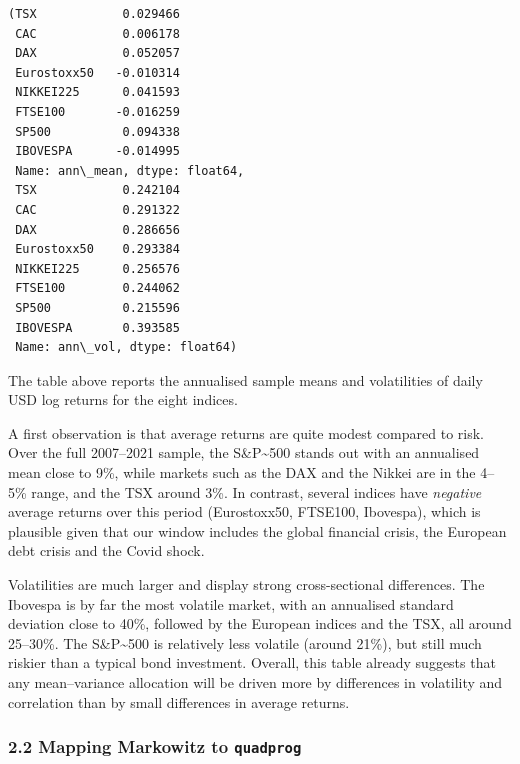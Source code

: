 \documentclass[11pt]{article}
\begin{document}
            \begin{tcolorbox}[breakable, size=fbox, boxrule=.5pt, pad at break*=1mm, opacityfill=0]
\begin{Verbatim}[commandchars=\\\{\}]
(TSX            0.029466
 CAC            0.006178
 DAX            0.052057
 Eurostoxx50   -0.010314
 NIKKEI225      0.041593
 FTSE100       -0.016259
 SP500          0.094338
 IBOVESPA      -0.014995
 Name: ann\_mean, dtype: float64,
 TSX            0.242104
 CAC            0.291322
 DAX            0.286656
 Eurostoxx50    0.293384
 NIKKEI225      0.256576
 FTSE100        0.244062
 SP500          0.215596
 IBOVESPA       0.393585
 Name: ann\_vol, dtype: float64)
\end{Verbatim}
\end{tcolorbox}
        
    The table above reports the annualised sample means and volatilities of
daily USD log returns for the eight indices.

A first observation is that average returns are quite modest compared to
risk. Over the full 2007--2021 sample, the S\&P\textasciitilde500 stands
out with an annualised mean close to 9\%, while markets such as the DAX
and the Nikkei are in the 4--5\% range, and the TSX around 3\%. In
contrast, several indices have \emph{negative} average returns over this
period (Eurostoxx50, FTSE100, Ibovespa), which is plausible given that
our window includes the global financial crisis, the European debt
crisis and the Covid shock.

Volatilities are much larger and display strong cross-sectional
differences. The Ibovespa is by far the most volatile market, with an
annualised standard deviation close to 40\%, followed by the European
indices and the TSX, all around 25--30\%. The S\&P\textasciitilde500 is
relatively less volatile (around 21\%), but still much riskier than a
typical bond investment. Overall, this table already suggests that any
mean--variance allocation will be driven more by differences in
volatility and correlation than by small differences in average returns.

    \hypertarget{mapping-markowitz-to-quadprog}{%
\subsubsection{\texorpdfstring{2.2 Mapping Markowitz to
\texttt{quadprog}}{2.2 Mapping Markowitz to quadprog}}\label{mapping-markowitz-to-quadprog}}
\end{document}
